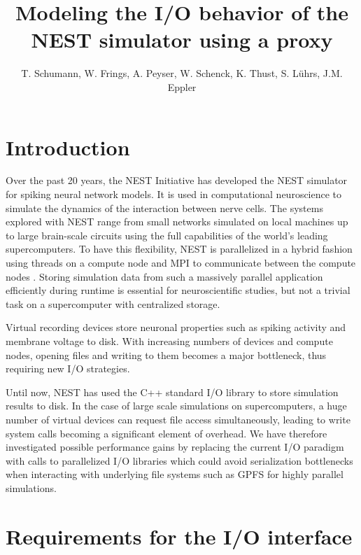 \documentclass[]{YIC2015}
\title{Modeling the I/O behavior of the NEST simulator using a proxy}
\author[T. Schumann et al.]{%
  T. Schumann\authref{a}\corref,
  W. Frings\authref{b},
  A. Peyser\authref{c},
  W. Schenck\authref{c},
  K. Thust\authref{b},
  S. L\"uhrs\authref{b},
  J.M. Eppler\authref{c}
}
\begin{document}
\maketitle

\section{Introduction}
%
Over the past 20 years, the NEST Initiative \cite{NESTInitiative} has
developed the NEST \cite{NEST} simulator for spiking neural network
models. It is used in computational neuroscience to simulate the
dynamics of the interaction between nerve cells. The systems explored
with NEST range from small networks simulated on local machines up to
large brain-scale circuits using the full capabilities of the world's
leading supercomputers. To have this flexibility, NEST is parallelized
in a hybrid fashion using threads on a compute node and MPI to
communicate between the compute nodes \cite{Plesser07}.  Storing
simulation data from such a massively parallel application efficiently
during runtime is essential for neuroscientific studies, but not a
trivial task on a supercomputer with centralized storage.

Virtual recording devices store neuronal properties such as spiking
activity and membrane voltage to disk. With increasing numbers of
devices and compute nodes, opening files and writing to them becomes a
major bottleneck, thus requiring new I/O strategies.

Until now, NEST has used the C++ standard I/O library to store
simulation results to disk. In the case of large scale simulations on
supercomputers, a huge number of virtual devices can request file
access simultaneously, leading to write system calls becoming a
significant element of overhead. We have therefore investigated
possible performance gains by replacing the current I/O paradigm with
calls to parallelized I/O libraries which could avoid serialization
bottlenecks when interacting with underlying file systems such as GPFS
\cite{GPFS} for highly parallel simulations.

\section{Requirements for the I/O interface}
\end{document}
